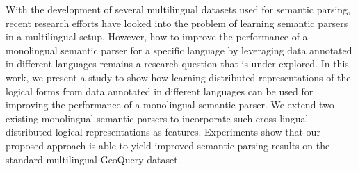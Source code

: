 With the development of several multilingual datasets used for semantic parsing, recent research efforts have looked into the problem of learning semantic parsers in a multilingual setup. However, how to improve the performance of a monolingual semantic parser for a specific language by leveraging data annotated in different languages remains a research question that is under-explored. In this work, we present a study to show how learning distributed representations of the logical forms from data annotated in different languages can be used for improving the performance of a monolingual semantic parser. We extend two existing monolingual semantic parsers to incorporate such cross-lingual distributed logical representations as features. Experiments show that our proposed approach is able to yield improved semantic parsing results on the standard multilingual GeoQuery dataset.
